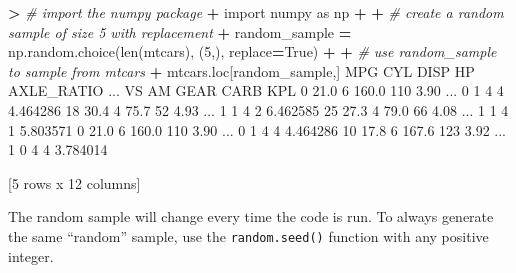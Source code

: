 \documentclass[
]{book}
\newenvironment{Shaded}{\begin{snugshade}}{\end{snugshade}}
\newcommand{\BuiltInTok}[1]{#1}
\newcommand{\CommentTok}[1]{\textcolor[rgb]{0.56,0.35,0.01}{\textit{#1}}}
\newcommand{\DecValTok}[1]{\textcolor[rgb]{0.00,0.00,0.81}{#1}}
\newcommand{\FloatTok}[1]{\textcolor[rgb]{0.00,0.00,0.81}{#1}}
\newcommand{\ImportTok}[1]{#1}
\newcommand{\NormalTok}[1]{#1}
\newcommand{\OperatorTok}[1]{\textcolor[rgb]{0.81,0.36,0.00}{\textbf{#1}}}
\newcommand{\VariableTok}[1]{\textcolor[rgb]{0.00,0.00,0.00}{#1}}
\begin{document}
\begin{Shaded}
\begin{Highlighting}[]
\OperatorTok{\textgreater{}} \CommentTok{\# import the numpy package}
\OperatorTok{+} \ImportTok{import}\NormalTok{ numpy }\ImportTok{as}\NormalTok{ np}
\OperatorTok{+} 
\OperatorTok{+} \CommentTok{\# create a random sample of size 5 with replacement}
\OperatorTok{+}\NormalTok{ random\_sample }\OperatorTok{=}\NormalTok{ np.random.choice(}\BuiltInTok{len}\NormalTok{(mtcars), (}\DecValTok{5}\NormalTok{,), replace}\OperatorTok{=}\VariableTok{True}\NormalTok{)}
\OperatorTok{+} 
\OperatorTok{+} \CommentTok{\# use random\_sample to sample from mtcars}
\OperatorTok{+}\NormalTok{ mtcars.loc[random\_sample,]}
\NormalTok{     MPG  CYL   DISP   HP  AXLE\_RATIO  ...  VS  AM  GEAR CARB       KPL}
\DecValTok{0}   \FloatTok{21.0}    \DecValTok{6}  \FloatTok{160.0}  \DecValTok{110}        \FloatTok{3.90}\NormalTok{  ...   }\DecValTok{0}   \DecValTok{1}     \DecValTok{4}    \DecValTok{4}  \FloatTok{4.464286}
\DecValTok{18}  \FloatTok{30.4}    \DecValTok{4}   \FloatTok{75.7}   \DecValTok{52}        \FloatTok{4.93}\NormalTok{  ...   }\DecValTok{1}   \DecValTok{1}     \DecValTok{4}    \DecValTok{2}  \FloatTok{6.462585}
\DecValTok{25}  \FloatTok{27.3}    \DecValTok{4}   \FloatTok{79.0}   \DecValTok{66}        \FloatTok{4.08}\NormalTok{  ...   }\DecValTok{1}   \DecValTok{1}     \DecValTok{4}    \DecValTok{1}  \FloatTok{5.803571}
\DecValTok{0}   \FloatTok{21.0}    \DecValTok{6}  \FloatTok{160.0}  \DecValTok{110}        \FloatTok{3.90}\NormalTok{  ...   }\DecValTok{0}   \DecValTok{1}     \DecValTok{4}    \DecValTok{4}  \FloatTok{4.464286}
\DecValTok{10}  \FloatTok{17.8}    \DecValTok{6}  \FloatTok{167.6}  \DecValTok{123}        \FloatTok{3.92}\NormalTok{  ...   }\DecValTok{1}   \DecValTok{0}     \DecValTok{4}    \DecValTok{4}  \FloatTok{3.784014}

\NormalTok{[}\DecValTok{5}\NormalTok{ rows x }\DecValTok{12}\NormalTok{ columns]}
\end{Highlighting}
\end{Shaded}

The random sample will change every time the code is run. To always generate the same ``random'' sample, use the \texttt{random.seed()} function with any positive integer.
\end{document}

